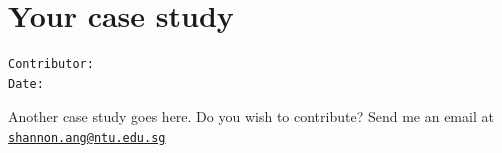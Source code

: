 \documentclass[
  openany]{book}
\begin{document}
\hypertarget{case3}{%
\chapter{Your case study}\label{case3}}

\begin{verbatim}
Contributor: 
Date: 
\end{verbatim}

Another case study goes here. Do you wish to contribute? Send me an email at \href{mailto:shannon.ang@ntu.edu.sg}{\nolinkurl{shannon.ang@ntu.edu.sg}}

  
\end{document}
